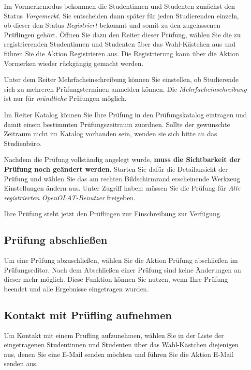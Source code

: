 \documentclass[a4paper,11pt]{article}
\newcommand{\knopf}[1]{{\sc #1}}
\begin{document}
Im Vormerkemodus bekommen die Studentinnen und Studenten zunächst den Status {\em Vorgemerkt}. Sie entscheiden dann später für jeden Studierenden einzeln,
ob dieser den Status {\em Registriert} bekommt und somit zu den zugelassenen Prüflingen gehört.
Öffnen Sie dazu den Reiter dieser Prüfung, wählen Sie die zu registrierenden
Studentinnen und Studenten über das Wahl-Kästchen aus und führen
Sie die Aktion \knopf{Registrieren} aus. Die Registrierung kann über die Aktion \knopf{Vormerken} wieder rückgängig gemacht werden.

Unter dem Reiter \knopf{Mehrfacheinschreibung} können Sie einstellen, ob
Studierende sich zu mehreren Prüfungsterminen anmelden können.
Die {\em Mehrfacheinschreibung} ist nur für {\em mündliche} Prüfungen möglich.

Im Reiter \knopf{Katalog} können Sie Ihre Prüfung in den Prüfungskatalog
eintragen und damit einem bestimmten Prüfungszeitraum zuordnen. Sollte der
gewünschte Zeitraum nicht im Katalog vorhanden sein, wenden sie sich bitte an
das Studienbüro.

Nachdem die Prüfung vollständig angelegt wurde, {\bf muss die Sichtbarkeit der
  Prüfung noch geändert werden}. Starten Sie dafür die \knopf{Detailansicht}
der Prüfung und wählen Sie das am rechten Bildschirmrand erscheinende Werkzeug
\knopf{Einstellungen ändern} aus. Unter \knopf{Zugriff haben:} müssen Sie die
Prüfung für {\em Alle registrierten OpenOLAT-Benutzer} freigeben.  

Ihre Prüfung steht jetzt den Prüflingen zur Einschreibung zur Verfügung.

\subsection{Prüfung abschließen}

Um eine Prüfung abzuschließen, wählen Sie die Aktion \knopf{Prüfung abschließen}
im Prüfungseditor. Nach dem Abschließen einer Prüfung sind keine Änderungen an
dieser mehr möglich. Diese Funktion können Sie nutzen, wenn Ihre Prüfung beendet
und alle Ergebnisse eingetragen wurden.

\subsection{Kontakt mit Prüfling aufnehmen}

Um Kontakt mit einem Prüfling aufzunehmen, wählen Sie in der Liste der
eingetragenen Studentinnen und Studenten über das Wahl-Kästchen
diejenigen aus, denen Sie eine E-Mail senden möchten und führen Sie die Aktion
\knopf{E-Mail senden} aus.
\end{document}
